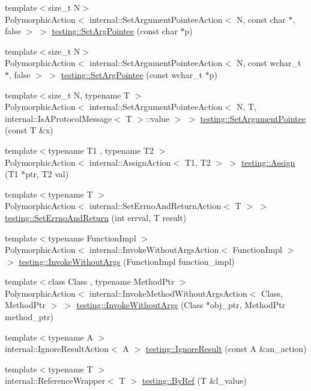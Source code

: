 \begin{DoxyCompactItemize}
\item 
{\footnotesize template$<$size\+\_\+t N$>$ }\\Polymorphic\+Action$<$ internal\+::\+Set\+Argument\+Pointee\+Action$<$ N, const char $\ast$, false $>$ $>$ \hyperlink{namespacetesting_a4a190fd2d02fb7cd79c5b3df3f80b647}{testing\+::\+Set\+Arg\+Pointee} (const char $\ast$p)
\item 
{\footnotesize template$<$size\+\_\+t N$>$ }\\Polymorphic\+Action$<$ internal\+::\+Set\+Argument\+Pointee\+Action$<$ N, const wchar\+\_\+t $\ast$, false $>$ $>$ \hyperlink{namespacetesting_ac128085b4a8d64563fd5ccef324ea177}{testing\+::\+Set\+Arg\+Pointee} (const wchar\+\_\+t $\ast$p)
\item 
{\footnotesize template$<$size\+\_\+t N, typename T $>$ }\\Polymorphic\+Action$<$ internal\+::\+Set\+Argument\+Pointee\+Action$<$ N, T, internal\+::\+Is\+A\+Protocol\+Message$<$ T $>$\+::value $>$ $>$ \hyperlink{namespacetesting_a03b315d27c91a8e719f2b6c09964130b}{testing\+::\+Set\+Argument\+Pointee} (const T \&x)
\item 
{\footnotesize template$<$typename T1 , typename T2 $>$ }\\Polymorphic\+Action$<$ internal\+::\+Assign\+Action$<$ T1, T2 $>$ $>$ \hyperlink{namespacetesting_abfc4121b8708e8b22a096ff8be88a9d0}{testing\+::\+Assign} (T1 $\ast$ptr, T2 val)
\item 
{\footnotesize template$<$typename T $>$ }\\Polymorphic\+Action$<$ internal\+::\+Set\+Errno\+And\+Return\+Action$<$ T $>$ $>$ \hyperlink{namespacetesting_a31095e421f167fade2e6d4d60df1f4da}{testing\+::\+Set\+Errno\+And\+Return} (int errval, T result)
\item 
{\footnotesize template$<$typename Function\+Impl $>$ }\\Polymorphic\+Action$<$ internal\+::\+Invoke\+Without\+Args\+Action$<$ Function\+Impl $>$ $>$ \hyperlink{namespacetesting_a88cc1999296bc630f6a49cdf66bb21f9}{testing\+::\+Invoke\+Without\+Args} (Function\+Impl function\+\_\+impl)
\item 
{\footnotesize template$<$class Class , typename Method\+Ptr $>$ }\\Polymorphic\+Action$<$ internal\+::\+Invoke\+Method\+Without\+Args\+Action$<$ Class, Method\+Ptr $>$ $>$ \hyperlink{namespacetesting_ab75325d71a8c37db94f349243815c728}{testing\+::\+Invoke\+Without\+Args} (Class $\ast$obj\+\_\+ptr, Method\+Ptr method\+\_\+ptr)
\item 
{\footnotesize template$<$typename A $>$ }\\internal\+::\+Ignore\+Result\+Action$<$ A $>$ \hyperlink{namespacetesting_a50ae42540a31047c7fddd32df8d835f5}{testing\+::\+Ignore\+Result} (const A \&an\+\_\+action)
\item 
{\footnotesize template$<$typename T $>$ }\\internal\+::\+Reference\+Wrapper$<$ T $>$ \hyperlink{namespacetesting_aaee6d42dcd69de6e7a1459c5c71222c3}{testing\+::\+By\+Ref} (T \&l\+\_\+value)
\end{DoxyCompactItemize}


